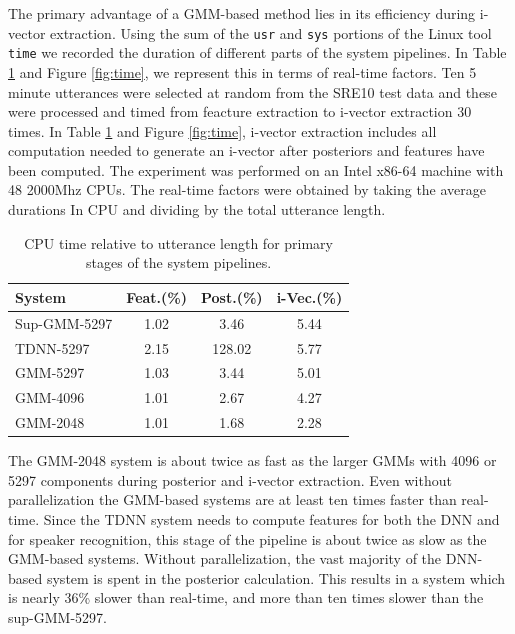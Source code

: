 \documentclass{article}
\begin{document}
The primary advantage of a GMM-based method lies in its
efficiency during i-vector extraction. Using the sum of the \texttt{usr}
and \texttt{sys}
portions of the Linux tool \texttt{time} we recorded the duration of
different parts of the system pipelines. In Table \ref{timing} and
Figure \ref{fig:time}, we represent this in terms of real-time factors.
Ten 5 minute utterances
were selected at random from the SRE10 test data and these were processed
and timed from feacture extraction to i-vector extraction 30 times. 
In Table \ref{timing} and
Figure \ref{fig:time}, i-vector extraction
includes all computation needed to generate an i-vector after posteriors and features
have been computed. The experiment was performed on an Intel x86-64 machine with 48 2000Mhz CPUs.
The real-time factors were obtained by taking the average durations In CPU and
dividing by the total utterance length. 

\begin{table}
\caption{CPU time relative to utterance length for primary stages of the system pipelines.}
\begin{center}
\begin{tabular}{l|ccc}
\hline
System & Feat.(\%) & Post.(\%) & i-Vec.(\%)\\ \hline \hline
Sup-GMM-5297 & 1.02 & 3.46 & 5.44 \\
TDNN-5297 & 2.15 & 128.02 & 5.77  \\
GMM-5297 & 1.03 & 3.44 & 5.01 \\
GMM-4096 & 1.01 & 2.67 & 4.27 \\
GMM-2048 & 1.01 & 1.68 & 2.28 \\ \hline
\end{tabular}
\end{center}
\label{timing}
\end{table}


The GMM-2048 system is about twice as fast as the
larger GMMs with 4096 or 5297 components during posterior and i-vector
extraction. Even without
parallelization the GMM-based systems are at least ten times faster than
real-time. Since the TDNN system needs to compute features for both the
DNN and for speaker recognition, this stage of the pipeline is about twice
as slow as the GMM-based systems.
Without parallelization, the vast majority of the DNN-based system is spent 
in the posterior calculation. This results in a system which is nearly 36\% slower 
than real-time, and more than ten times slower than the sup-GMM-5297.
\end{document}
